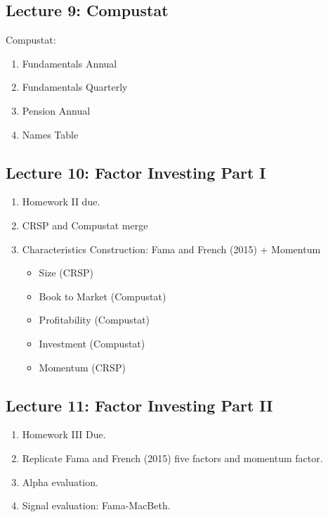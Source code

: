\documentclass[12pts]{article}
\begin{document}
\subsection*{Lecture 9: Compustat}
Compustat:
	\begin{enumerate}
		\item Fundamentals Annual
		\item Fundamentals Quarterly
		\item Pension Annual
		\item Names Table 
	\end{enumerate}

\subsection*{Lecture 10: Factor Investing Part I}

\begin{enumerate}
	\item Homework II due.
	\item CRSP and Compustat merge
	\item Characteristics Construction: Fama and French (2015) + Momentum
	\begin{itemize}
		\item Size (CRSP)
		\item Book to Market (Compustat)
		\item Profitability (Compustat)
		\item Investment (Compustat)
		\item Momentum (CRSP)
	\end{itemize}
\end{enumerate}

\subsection*{Lecture 11: Factor Investing Part II}
\begin{enumerate}
	\item Homework III Due.
	\item Replicate Fama and French (2015) five factors and momentum factor.
	\item Alpha evaluation.
	\item Signal evaluation: Fama-MacBeth.
\end{enumerate}	
\end{document}
